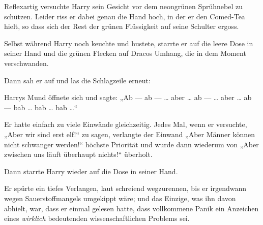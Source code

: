 Reflexartig versuchte Harry sein Gesicht vor dem neongrünen Sprühnebel zu schützen. Leider riss er dabei genau die Hand hoch, in der er den Comed-Tea hielt, so dass sich der Rest der grünen Flüssigkeit auf seine Schulter ergoss.

Selbst während Harry noch keuchte und hustete, starrte er auf die leere Dose in seiner Hand und die grünen Flecken auf Dracos Umhang, die in dem Moment verschwanden.

Dann sah er auf und las die Schlagzeile erneut:


Harrys Mund öffnete sich und sagte:
„Ab — ab — … aber … ab — … aber … ab — bab … bab … bab …“

Er hatte einfach zu viele Einwände gleichzeitig. Jedes Mal, wenn er versuchte,
„Aber wir sind erst elf!“ zu sagen, verlangte der Einwand
„Aber Männer können nicht schwanger werden!“ höchste Priorität und wurde dann wiederum von
„Aber zwischen uns läuft überhaupt nichts!“ überholt.

Dann starrte Harry wieder auf die Dose in seiner Hand.

Er spürte ein tiefes Verlangen, laut schreiend wegzurennen, bis er irgendwann wegen Sauerstoffmangels umgekippt wäre; und das Einzige, was ihn davon abhielt, war, dass er einmal gelesen hatte, dass vollkommene Panik ein Anzeichen eines \emph{wirklich} bedeutenden wissenschaftlichen Problems sei.


